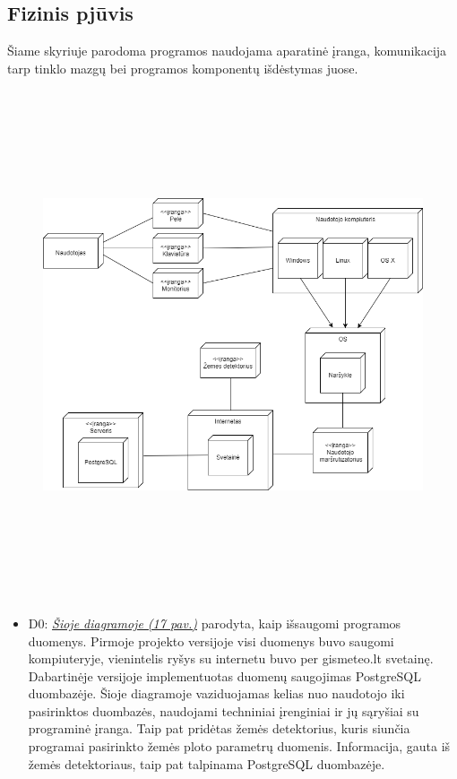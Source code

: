 \documentclass[oneside]{VUMIFPSkursinis}
\begin{document}
\subsection{Fizinis pjūvis}
	Šiame skyriuje parodoma programos naudojama aparatinė įranga, komunikacija tarp tinklo mazgų bei programos komponentų išdėstymas juose.
	\newline
	\vskip 0.5cm
	\begin{figure}[H]
	\centering	
	\includegraphics[width=15cm,height=15cm,keepaspectratio]{2D0.png}
	\caption{}
	\label{fig:Deployment}
\end{figure}
	\begin{itemize}
		\item D0: \hyperref[fig:Deployment]{\textit{Šioje diagramoje (17 pav.)}} parodyta, kaip išsaugomi programos duomenys. 
		Pirmoje projekto versijoje visi duomenys buvo saugomi kompiuteryje, vienintelis ryšys su internetu buvo per gismeteo.lt svetainę. Dabartinėje versijoje implementuotas duomenų saugojimas PostgreSQL duombazėje. Šioje diagramoje vaziduojamas kelias nuo naudotojo iki pasirinktos duombazės, naudojami techniniai įrenginiai ir jų sąryšiai su programinė įranga. Taip pat pridėtas žemės detektorius, kuris siunčia programai pasirinkto žemės ploto parametrų duomenis. Informacija, gauta iš žemės detektoriaus, taip pat talpinama PostgreSQL duombazėje.
	\end{itemize}
\end{document}
